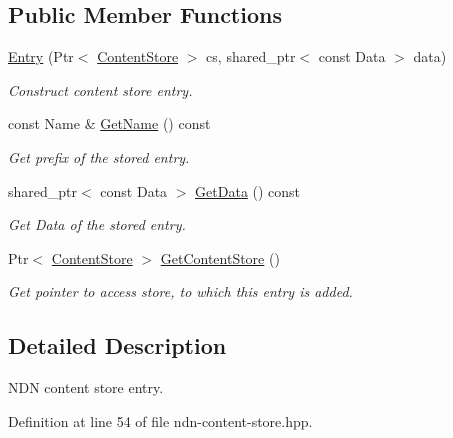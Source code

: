 \subsection*{Public Member Functions}
\begin{DoxyCompactItemize}
\item 
\hyperlink{classns3_1_1ndn_1_1cs_1_1Entry_a207df44f73ec896a12369d5e13205fc6}{Entry} (Ptr$<$ \hyperlink{classns3_1_1ndn_1_1ContentStore}{Content\+Store} $>$ cs, shared\+\_\+ptr$<$ const Data $>$ data)
\begin{DoxyCompactList}\small\item\em Construct content store entry. \end{DoxyCompactList}\item 
const Name \& \hyperlink{classns3_1_1ndn_1_1cs_1_1Entry_ac47c1172978749fdb134b8323beb9658}{Get\+Name} () const
\begin{DoxyCompactList}\small\item\em Get prefix of the stored entry. \end{DoxyCompactList}\item 
shared\+\_\+ptr$<$ const Data $>$ \hyperlink{classns3_1_1ndn_1_1cs_1_1Entry_ae8b647891eec3227ac00a4674f4aad50}{Get\+Data} () const
\begin{DoxyCompactList}\small\item\em Get Data of the stored entry. \end{DoxyCompactList}\item 
Ptr$<$ \hyperlink{classns3_1_1ndn_1_1ContentStore}{Content\+Store} $>$ \hyperlink{classns3_1_1ndn_1_1cs_1_1Entry_a8f55a4beeb1e8903b021c040616cfba7}{Get\+Content\+Store} ()\hypertarget{classns3_1_1ndn_1_1cs_1_1Entry_a8f55a4beeb1e8903b021c040616cfba7}{}\label{classns3_1_1ndn_1_1cs_1_1Entry_a8f55a4beeb1e8903b021c040616cfba7}

\begin{DoxyCompactList}\small\item\em Get pointer to access store, to which this entry is added. \end{DoxyCompactList}\end{DoxyCompactItemize}


\subsection{Detailed Description}
N\+DN content store entry. 

Definition at line 54 of file ndn-\/content-\/store.\+hpp.



